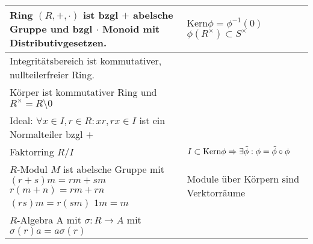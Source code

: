 \begin{tabular}{p{}|p{}}
    \\\hline
    Ring $(R,+,\cdot)$ ist bzgl $+$ abelsche Gruppe und bzgl $\cdot$ Monoid mit Distributivgesetzen.
    &
     $\text{Kern}\phi=\phi^{-1}({0})$ \newline
     $\phi(R^\times)\subset S^\times$
    \\\hline
    Integritätsbereich ist kommutativer, nullteilerfreier Ring.
    \\\hline
    Körper ist kommutativer Ring und $R^\times = R\setminus {0}$
    \\\hline
    Ideal: $\forall x\in I, r\in R: xr,rx \in I$ ist ein Normalteiler bzgl $+$
    \\\hline 
    Faktorring $R/I$ &
     $I\subset \text{Kern}\phi \Rightarrow \exists \Tilde{\phi}: \phi=\Tilde{\phi}\circ\phi$
    \\\hline
    $R$-Modul $M$ ist abelsche Gruppe mit \newline
    $(r+s)m=rm+sm$ \newline
    $r(m+n)=rm+rn$ \newline
    $(rs)m=r(sm)$ \newline
    $1m=m$ &
     Module über Körpern sind Verktorräume
    \\\hline
    $R$-Algebra A mit $\sigma:R\to A$ mit $\sigma(r)a=a\sigma(r)$
    
\end{tabular}
